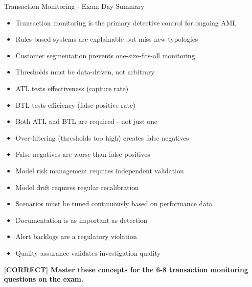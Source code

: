 \documentclass[11pt,a4paper]{beamer}
\newcommand{\greennote}[1]{\textcolor{green!50!black}{\textbf{[CORRECT] #1}}}
\begin{document}
	\begin{frame}{Transaction Monitoring - Exam Day Summary}
	\begin{itemize}
		\item Transaction monitoring is the primary detective control for ongoing AML
		\item Rules-based systems are explainable but miss new typologies
		\item Customer segmentation prevents one-size-fits-all monitoring
		\item Thresholds must be data-driven, not arbitrary
		\item ATL tests effectiveness (capture rate)
		\item BTL tests efficiency (false positive rate)
		\item Both ATL and BTL are required - not just one
		\item Over-filtering (thresholds too high) creates false negatives
		\item False negatives are worse than false positives
		\item Model risk management requires independent validation
		\item Model drift requires regular recalibration
		\item Scenarios must be tuned continuously based on performance data
		\item Documentation is as important as detection
		\item Alert backlogs are a regulatory violation
		\item Quality assurance validates investigation quality
	\end{itemize}
	
	\greennote{Master these concepts for the 6-8 transaction monitoring questions on the exam.}
	\end{frame}
	
\end{document}
